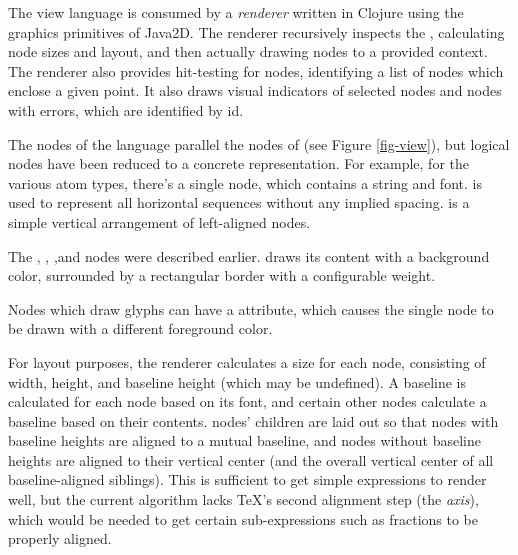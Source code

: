 The view language is consumed by a \emph{renderer} written in Clojure using the graphics primitives of Java2D\cite{java2d}. The renderer recursively inspects the , calculating node sizes and layout, and then actually drawing nodes to a provided context.
The renderer also provides hit-testing for nodes, identifying a list of  nodes which enclose a given point. It also draws visual indicators of selected nodes and nodes with errors, which are identified by id.











The nodes of the  language parallel the nodes of  (see Figure \ref{fig-view}), but logical nodes have been reduced to a concrete representation. For example, for the various atom types, there's a single  node, which contains a string and font.  is used to represent all horizontal sequences without any implied spacing.  is a simple vertical arrangement of left-aligned nodes.

The , , ,and  nodes were described earlier.  draws its content with a background color, surrounded by a rectangular border with a configurable weight.

Nodes which draw glyphs can have a  attribute, which causes the single node to be drawn with a different foreground color.

For layout purposes, the renderer calculates a size for each node, consisting of width, height, and baseline height (which may be undefined). A baseline is calculated for each  node based on its font, and certain other nodes calculate a baseline based on their contents.  nodes' children are laid out so that nodes with baseline heights are aligned to a mutual baseline, and nodes without baseline heights are aligned to their vertical center (and the overall vertical center of all baseline-aligned siblings). This is sufficient to get simple expressions to render well, but the current algorithm lacks \TeX's second alignment step (the \emph{axis}), which would be needed to get certain sub-expressions such as fractions to be properly aligned.
 
